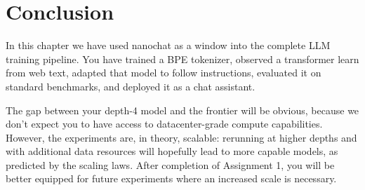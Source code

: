 \section{Conclusion}
\label{sec:conclusion}

In this chapter we have used nanochat as a window into the complete LLM training pipeline.  You have trained a BPE tokenizer, observed a transformer learn from web text, adapted that model to follow instructions, evaluated it on standard benchmarks, and deployed it as a chat assistant.

The gap between your depth-4 model and the frontier will be obvious, because we don't expect you to have access to datacenter-grade compute capabilities. However, the experiments are, in theory, scalable: rerunning at higher depths and with additional data resources will hopefully lead to more capable models, as predicted by the scaling laws. After completion of Assignment 1, you will be better equipped for future experiments where an increased scale is necessary.

